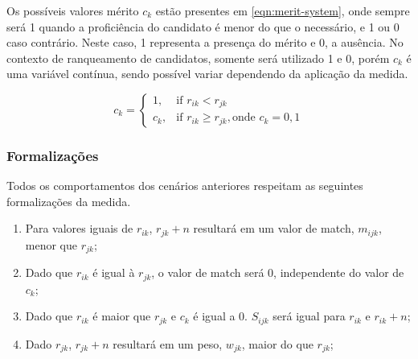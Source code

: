 \documentclass[preprint,12pt]{elsarticle}
\begin{document}
Os possíveis valores mérito $c_{k}$ estão presentes em \ref{eqn:merit-system}, onde sempre será 1 quando a proficiência do candidato é menor do que o necessário, e 1 ou 0 caso contrário. Neste caso, 1 representa a presença do mérito e 0, a ausência. No contexto de ranqueamento de candidatos, somente será utilizado 1 e 0, porém $c_{k}$ é uma variável contínua, sendo possível variar dependendo da aplicação da medida.

\begin{equation}
\label{eqn:merit-system}
c_{k} = \begin{cases} 1, & \text{if } r_{ik} < r_{jk} \\ c_{k}, & \text{if } r_{ik} \geq r_{jk}, \text{onde } c_k = 0, 1 \end{cases}
\end{equation}

\subsubsection{Formalizações}

Todos os comportamentos dos cenários anteriores respeitam as seguintes formalizações da medida.

\begin{enumerate}
\item Para valores iguais de $r_{ik}$, $r_{jk} + n$ resultará em um valor de match, $m_{ijk}$, menor que $r_{jk}$;
\item Dado que $r_{ik}$ é igual à $r_{jk}$, o valor de match será $0$, independente do valor de $c_{k}$;
\item Dado que $r_{ik}$ é maior que $r_{jk}$ e $c_k$ é igual a 0. $S_{ijk}$ será igual para $r_{ik}$ e $r_{ik} + n$; 
\item Dado $r_{jk}$, $r_{jk} + n$ resultará em um peso, $w_{jk}$, maior do que $r_{jk}$; 

\end{enumerate}


\end{document}
